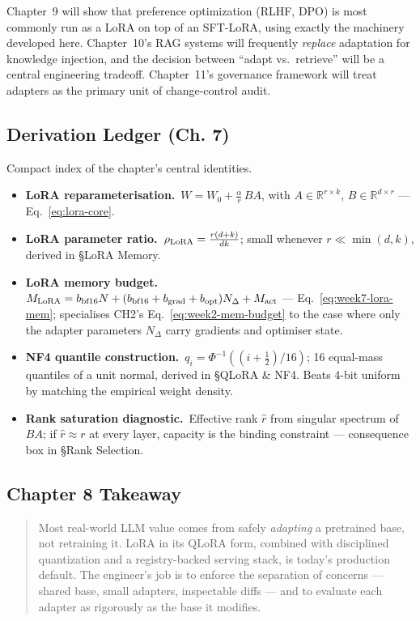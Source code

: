 Chapter~9 will show that preference optimization (RLHF, DPO) is most
commonly run as a LoRA on top of an SFT-LoRA, using exactly the
machinery developed here. Chapter~10's RAG systems will frequently
\emph{replace} adaptation for knowledge injection, and the decision
between ``adapt vs.\ retrieve'' will be a central engineering tradeoff.
Chapter~11's governance framework will treat adapters as the primary
unit of change-control audit.

\subsection*{Derivation Ledger (Ch. 7)}

\begin{derivledger}
Compact index of the chapter's central identities.
\begin{itemize}
  \item \textbf{LoRA reparameterisation.}\
        $W = W_0 + \frac{\alpha}{r}\, B A$, with $A \in \mathbb{R}^{r \times k}$,
        $B \in \mathbb{R}^{d \times r}$ --- Eq.~\eqref{eq:lora-core}.
  \item \textbf{LoRA parameter ratio.}\
        $\rho_{\rm LoRA} = \frac{r(d+k)}{d k}$;
        small whenever $r \ll \min(d, k)$, derived in §LoRA Memory.
  \item \textbf{LoRA memory budget.}\
        $M_{\rm LoRA} = b_{\rm bf16} N + (b_{\rm bf16} + b_{\rm grad} + b_{\rm opt}) N_\Delta + M_{\rm act}$
        --- Eq.~\eqref{eq:week7-lora-mem}; specialises CH2's
        Eq.~\eqref{eq:week2-mem-budget} to the case where only the
        adapter parameters $N_\Delta$ carry gradients and optimiser
        state.
  \item \textbf{NF4 quantile construction.}\
        $q_i = \Phi^{-1}((i + \tfrac{1}{2})/16)$;
        16 equal-mass quantiles of a unit normal, derived in
        §QLoRA \& NF4. Beats 4-bit uniform by matching the
        empirical weight density.
  \item \textbf{Rank saturation diagnostic.}\
        Effective rank $\hat r$ from singular spectrum of $BA$;
        if $\hat r \approx r$ at every layer, capacity is the
        binding constraint --- consequence box in §Rank Selection.
\end{itemize}
\end{derivledger}

\subsection{Chapter 8 Takeaway}

\begin{quote}
Most real-world LLM value comes from safely \emph{adapting} a
pretrained base, not retraining it. LoRA in its QLoRA form, combined
with disciplined quantization and a registry-backed serving stack, is
today's production default. The engineer's job is to enforce the
separation of concerns --- shared base, small adapters, inspectable
diffs --- and to evaluate each adapter as rigorously as the base it
modifies.
\end{quote}
